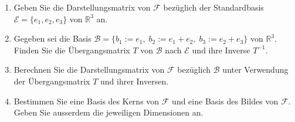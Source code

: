 \begin{enumerate}[label=\alph*)]
    \item Geben Sie die Darstellungsmatrix von \( \mathcal{F} \) bezüglich der Standardbasis \( \mathcal{E} = \{e_1,e_2,e_3\} \) von \( \mathbb{R}^3 \) an.
    \item Gegeben sei die Basis \( \mathcal{B} = \{b_1 := e_1,\; b_2 :=e_1+e_2,\; b_3 := e_2+e_3 \} \) von \( \mathbb{R}^3 \). Finden Sie die Übergangsmatrix \( T \) von \( \mathcal{B} \) nach \( \mathcal{E} \) und ihre Inverse \( T^{-1} \).
    \item Berechnen Sie die Darstellungsmatrix von $\mathcal{F}$ bezüglich $\mathcal{B}$ unter Verwendung der Übergangsmatrix $T$ und ihrer Inversen.
    \item Bestimmen Sie eine Basis des Kerns von \( \mathcal{F} \) und eine Basis des Bildes von \( \mathcal{F} \). Geben Sie ausserdem die jeweiligen Dimensionen an.
\end{enumerate}

\vspace{1\baselineskip}


